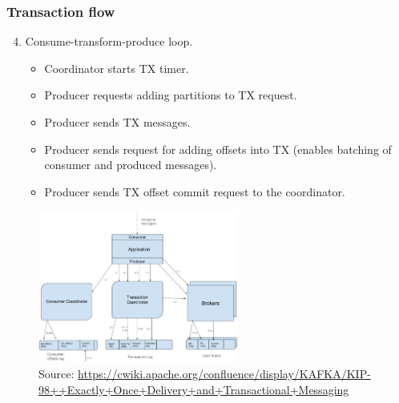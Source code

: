 \documentclass[10pt,utf8]{beamer}
\begin{document}
\begin{frame}
    \frametitle{Transaction flow}
    \begin{enumerate}
        \setcounter{enumi}{3}
        \item Consume-transform-produce loop.
          \begin{itemize}
            \item Coordinator starts TX timer.
            \item Producer requests adding partitions to TX request.
            \item Producer sends TX messages.
            \item Producer sends request for adding offsets into TX (enables batching of consumer and produced messages).
            \item Producer sends TX offset commit request to the coordinator.
          \end{itemize}
    \end{enumerate}
    \begin{figure}
        \centering
        \includegraphics[height=5cm]{./img/tx_flow.eps}
        \caption{\tiny{Source: \url{https://cwiki.apache.org/confluence/display/KAFKA/KIP-98++Exactly+Once+Delivery+and+Transactional+Messaging}}}
    \end{figure}
\end{frame}
\end{document}
